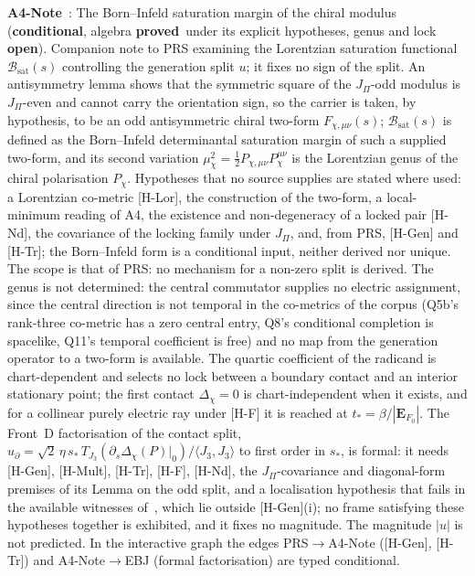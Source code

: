\documentclass[11pt,a4paper]{article}
\newcommand{\sproved}{\textcolor{cproved}{\textbf{proved}}}
\newcommand{\sopen}{\textcolor{copen}{\textbf{open}}}
\newcommand{\scond}{\textcolor{ccond}{\textbf{conditional}}}
\begin{document}
    \textbf{A4-Note}~\cite{Beau2026bim}: The Born--Infeld saturation margin of the chiral
    modulus (\scond, algebra \sproved\ under its explicit hypotheses, genus and lock \sopen).
    Companion note to PRS examining the Lorentzian saturation functional $\mathcal{B}_{\mathrm{sat}}(s)$ controlling the
    generation split $u$; it fixes no sign of the split.
    An antisymmetry lemma shows that the symmetric square of the $J_\Pi$-odd modulus is $J_\Pi$-even and cannot carry
    the orientation sign, so the carrier is taken, by hypothesis, to be an odd antisymmetric chiral two-form
    $F_{\chi,\mu\nu}(s)$; $\mathcal{B}_{\mathrm{sat}}(s)$ is defined as the Born--Infeld determinantal saturation
    margin of such a supplied two-form, and its second variation
    $\mu_\chi^2 = \tfrac{1}{2} P_{\chi,\mu\nu} P_\chi^{\mu\nu}$ is the Lorentzian genus of the chiral polarisation
    $P_\chi$.
    Hypotheses that no source supplies are stated where used: a Lorentzian co-metric [H-Lor], the construction of the
    two-form, a local-minimum reading of A4, the existence and non-degeneracy of a locked pair [H-Nd], the covariance
    of the locking family under $J_\Pi$, and, from PRS, [H-Gen] and [H-Tr]; the Born--Infeld form is a conditional
    input, neither derived nor unique.
    The scope is that of PRS: no mechanism for a non-zero split is derived.
    The genus is not determined: the central commutator supplies no electric assignment, since the central direction
    is not temporal in the co-metrics of the corpus (Q5b's rank-three co-metric has a zero central entry, Q8's
    conditional completion is spacelike, Q11's temporal coefficient is free) and no map from the generation operator
    to a two-form is available.
    The quartic coefficient of the radicand is chart-dependent and selects no lock between a boundary contact and an
    interior stationary point; the first contact $\Delta_\chi = 0$ is chart-independent when it exists, and for a
    collinear purely electric ray under [H-F] it is reached at $t_* = \beta/|\mathbf{E}_{F_0}|$.
    The Front~D factorisation of the contact split,
    $u_\partial = \sqrt{2}\,\eta\,s_*\,T_{J_3}(\partial_s\Delta_\chi(P)|_0)/\langle J_3, J_3\rangle$ to first order in
    $s_*$, is formal: it needs [H-Gen], [H-Mult], [H-Tr], [H-F], [H-Nd], the $J_\Pi$-covariance and diagonal-form premises of its
    Lemma on the odd split, and a localisation hypothesis that fails in the
    available witnesses of~\cite{Beau2026ebj}, which lie outside [H-Gen](i); no frame satisfying these hypotheses
    together is exhibited, and it fixes no magnitude.
    The magnitude $|u|$ is not predicted.
    In the interactive graph the edges PRS$\to$A4-Note ([H-Gen], [H-Tr]) and A4-Note$\to$EBJ (formal factorisation)
    are typed conditional.
\end{document}
